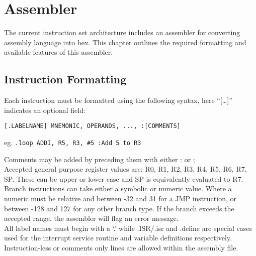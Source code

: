 
\section{Assembler}
The current instruction set architecture includes an assembler for converting assembly language into hex. This chapter outlines the required formatting and available features of this assembler. 

\subsection{Instruction Formatting}
Each instruction must be formatted using the following syntax, here ``[\dots]'' indicates an optional field:

\begin{center}\texttt{[.LABELNAME] MNEMONIC, OPERANDS, ..., :[COMMENTS]}\end{center}

\begin{center}eg. \texttt{.loop ADDI, R5, R3, \#5 :Add 5 to R3}
\end{center}

\noindent Comments may be added by preceding them with either : or ;\\

\noindent Accepted general purpose register values are: R0, R1, R2, R3, R4, R5, R6, R7, SP. These can be upper or lower case and SP is equivalently evaluated to R7.\\

\noindent Branch instructions can take either a symbolic or numeric value. 
Where a numeric must be relative and between -32 and 31 for a JMP instruction, or between -128 and 127 for any other branch type. 
If the branch exceeds the accepted range, the assembler will flag an error message. \\

\noindent All label names must begin with a `.' while .ISR/.isr and .define are special cases used for the interrupt service routine and variable definitions respectively. \\

\noindent Instruction-less or comments only lines are allowed within the assembly file. \\
\newpage
{}

